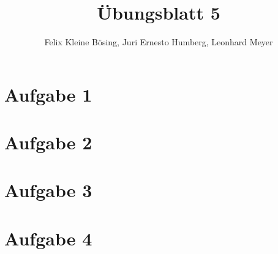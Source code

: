 \documentclass[11pt]{article}
\begin{document}
\title{Übungsblatt 5}
\author{Felix Kleine Bösing, Juri Ernesto Humberg, Leonhard Meyer}
\maketitle

\section*{Aufgabe 1}

\section*{Aufgabe 2}

\section*{Aufgabe 3}

\section*{Aufgabe 4}
\end{document}
